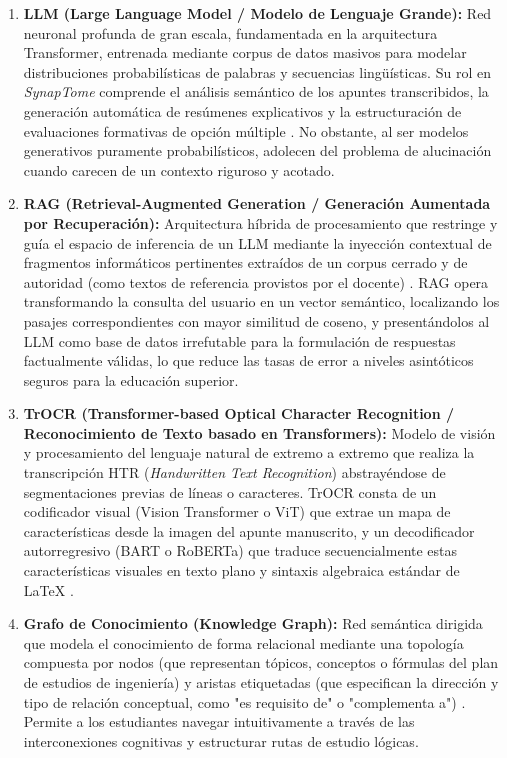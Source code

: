 \begin{enumerate}[label=\alph*), leftmargin=*]
  \item \textbf{LLM (Large Language Model / Modelo de Lenguaje Grande):} Red neuronal profunda de gran escala, fundamentada en la arquitectura Transformer, entrenada mediante corpus de datos masivos para modelar distribuciones probabilísticas de palabras y secuencias lingüísticas. Su rol en \textit{SynapTome} comprende el análisis semántico de los apuntes transcribidos, la generación automática de resúmenes explicativos y la estructuración de evaluaciones formativas de opción múltiple \parencite{Vaswani2017, KardanMoghaddam2025}. No obstante, al ser modelos generativos puramente probabilísticos, adolecen del problema de alucinación cuando carecen de un contexto riguroso y acotado.

  \item \textbf{RAG (Retrieval-Augmented Generation / Generación Aumentada por Recuperación):} Arquitectura híbrida de procesamiento que restringe y guía el espacio de inferencia de un LLM mediante la inyección contextual de fragmentos informáticos pertinentes extraídos de un corpus cerrado y de autoridad (como textos de referencia provistos por el docente) \parencite{Kannammal2024}. RAG opera transformando la consulta del usuario en un vector semántico, localizando los pasajes correspondientes con mayor similitud de coseno, y presentándolos al LLM como base de datos irrefutable para la formulación de respuestas factualmente válidas, lo que reduce las tasas de error a niveles asintóticos seguros para la educación superior.

  \item \textbf{TrOCR (Transformer-based Optical Character Recognition / Reconocimiento de Texto basado en Transformers):} Modelo de visión y procesamiento del lenguaje natural de extremo a extremo que realiza la transcripción HTR (\textit{Handwritten Text Recognition}) abstrayéndose de segmentaciones previas de líneas o caracteres. TrOCR consta de un codificador visual (Vision Transformer o ViT) que extrae un mapa de características desde la imagen del apunte manuscrito, y un decodificador autorregresivo (BART o RoBERTa) que traduce secuencialmente estas características visuales en texto plano y sintaxis algebraica estándar de \LaTeX{} \parencite{Zhang2026, LiTrOCR2023}.

  \item \textbf{Grafo de Conocimiento (Knowledge Graph):} Red semántica dirigida que modela el conocimiento de forma relacional mediante una topología compuesta por nodos (que representan tópicos, conceptos o fórmulas del plan de estudios de ingeniería) y aristas etiquetadas (que especifican la dirección y tipo de relación conceptual, como "es requisito de" o "complementa a") \parencite{Chen2023}. Permite a los estudiantes navegar intuitivamente a través de las interconexiones cognitivas y estructurar rutas de estudio lógicas.


\end{enumerate}
